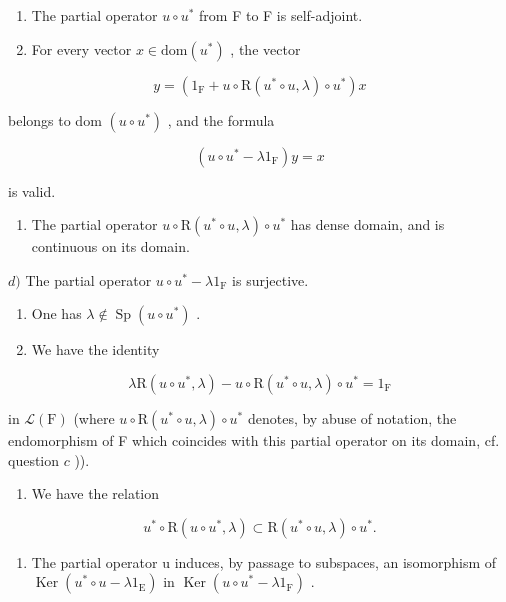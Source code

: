 \begin{enumerate}
\def\labelenumi{\alph{enumi})}
\item
  The partial operator \(u \circ u^{*}\) from F to F is self-adjoint.
\item
  For every vector \(x \in \mathrm{dom}(u^{*})\) , the vector
\end{enumerate}

\[
y = (1 _ {\mathrm{F}} + u \circ \mathrm{R} (u ^ {*} \circ u, \lambda) \circ u ^ {*}) x
\]

belongs to dom \((u\circ u^{*})\) , and the formula

\[
(u \circ u ^ {*} - \lambda 1 _ {\mathrm{F}}) y = x
\]

is valid.

\begin{enumerate}
\def\labelenumi{\alph{enumi})}
\setcounter{enumi}{2}
\tightlist
\item
  The partial operator \(u \circ \mathrm{R}(u^* \circ u, \lambda) \circ u^*\) has dense domain, and is continuous on its domain.
\end{enumerate}

\(d)\) The partial operator \(u \circ u^{*} - \lambda 1_{\mathrm{F}}\) is surjective.

\begin{enumerate}
\def\labelenumi{\alph{enumi})}
\setcounter{enumi}{4}
\item
  One has \(\lambda \notin \operatorname{Sp}(u \circ u^{*})\) .
\item
  We have the identity
\end{enumerate}

\[
\lambda \mathrm{R} (u \circ u ^ {*}, \lambda) - u \circ \mathrm{R} (u ^ {*} \circ u, \lambda) \circ u ^ {*} = 1 _ {\mathrm{F}}
\]

in \(\mathcal{L}(\mathrm{F})\) (where \(u\circ \mathrm{R}(u^{*}\circ u,\lambda)\circ u^{*}\) denotes, by abuse of notation, the endomorphism of F which coincides with this partial operator on its domain, cf. question \(c\) )).

\begin{enumerate}
\def\labelenumi{\alph{enumi})}
\setcounter{enumi}{6}
\tightlist
\item
  We have the relation
\end{enumerate}

\[
u ^ {*} \circ \mathrm{R} (u \circ u ^ {*}, \lambda) \subset \mathrm{R} (u ^ {*} \circ u, \lambda) \circ u ^ {*}.
\]

\begin{enumerate}
\def\labelenumi{\alph{enumi})}
\setcounter{enumi}{7}
\tightlist
\item
  The partial operator u induces, by passage to subspaces, an isomorphism of \(\operatorname{Ker}(u^{*} \circ u - \lambda1_{\mathrm{E}})\) in \(\operatorname{Ker}(u \circ u^{*} - \lambda1_{\mathrm{F}})\) .
\end{enumerate}

